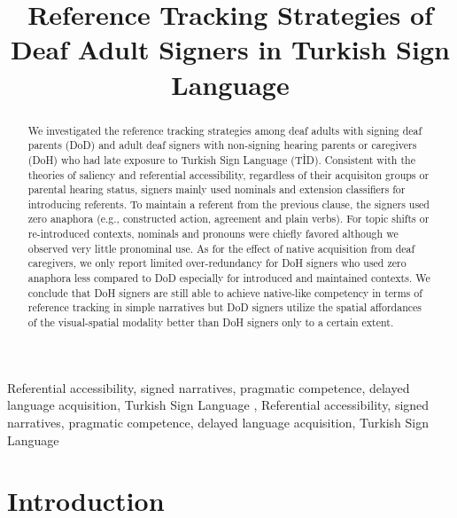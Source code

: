 \documentclass[review]{elsarticle} %
\begin{document}
\begin{frontmatter}

  \title{Reference Tracking Strategies of Deaf Adult Signers in Turkish
Sign Language}
  
  \begin{abstract}
  We investigated the reference tracking strategies among deaf adults
  with signing deaf parents (DoD) and adult deaf signers with
  non-signing hearing parents or caregivers (DoH) who had late exposure
  to Turkish Sign Language (TİD). Consistent with the theories of
  saliency and referential accessibility, regardless of their acquisiton
  groups or parental hearing status, signers mainly used nominals and
  extension classifiers for introducing referents. To maintain a
  referent from the previous clause, the signers used zero anaphora
  (e.g., constructed action, agreement and plain verbs). For topic
  shifts or re-introduced contexts, nominals and pronouns were chiefly
  favored although we observed very little pronominal use. As for the
  effect of native acquisition from deaf caregivers, we only report
  limited over-redundancy for DoH signers who used zero anaphora less
  compared to DoD especially for introduced and maintained contexts. We
  conclude that DoH signers are still able to achieve native-like
  competency in terms of reference tracking in simple narratives but DoD
  signers utilize the spatial affordances of the visual-spatial modality
  better than DoH signers only to a certain extent.
  \end{abstract}
    \begin{keyword}
    Referential accessibility, signed narratives, pragmatic competence,
delayed language acquisition, Turkish Sign Language \sep 
    Referential accessibility, signed narratives, pragmatic competence,
delayed language acquisition, Turkish Sign Language
  \end{keyword}
  
 \end{frontmatter}

\hypertarget{introduction}{%
\section{Introduction}\label{introduction}}
\end{document}
